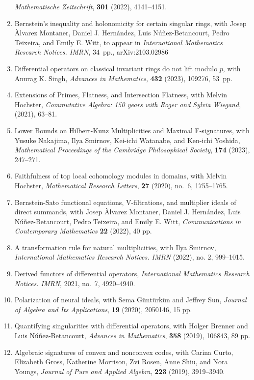 \documentclass[12pt]{amsart}
\newcommand{\N}{}
\begin{document}
\begin{enumerate}[leftmargin=9mm]
\emph{Mathematische Zeitschrift}, \textbf{301} (2022), 4141--4151.
	\item Bernstein's inequality and holonomicity for certain singular rings,
	with Josep Àlvarez Montaner, Daniel J. Hernández, Luis Núñez-Betancourt, Pedro Teixeira, and Emily E. Witt,
to appear in \emph{International Mathematics Research Notices. IMRN}, 34~pp., arXiv:2103.02986
	\item Differential operators on classical invariant rings do not lift modulo $p$,
with Anurag K. Singh, \emph{Advances in Mathematics}, \textbf{432} (2023), 109276, 53~pp.
\item Extensions of Primes, Flatness, and Intersection Flatness, with Melvin Hochster, \emph{Commutative Algebra: 150 years with Roger and Sylvia Wiegand}, (2021), 63--81. \N
\item Lower Bounds on Hilbert-Kunz Multiplicities and Maximal F-signatures, 
with Yusuke Nakajima, Ilya Smirnov, Kei-ichi Watanabe, and Ken-ichi Yoshida, 
\emph{Mathematical Proceedings of the Cambridge Philosophical Society},  \textbf{174} (2023), 247--271.
\item Faithfulness of top local cohomology modules in domains,
with Melvin Hochster, \emph{Mathematical Research Letters}, \textbf{27} (2020), no.~6, 1755--1765.  \N
\item Bernstein-Sato functional equations, V-filtrations, and multiplier ideals of direct summands,
with Josep \`Alvarez Montaner, Daniel J. Hernández, Luis N\'u\~nez-Betancourt, Pedro Teixeira, and Emily E. Witt,
\emph{Communications in Contemporary Mathematics} \textbf{22} (2022), 40 pp.  \N
\item A transformation rule for natural multiplicities,
with Ilya Smirnov,  \emph{International Mathematics Research Notices. IMRN} (2022), no. 2, 999--1015.
\item Derived functors of differential operators,   \emph{International Mathematics Research Notices. IMRN}, 2021, no.~7, 4920--4940. \N
\item Polarization of neural ideals, with Sema G\"unt\"urk\"un and Jeffrey Sun, \emph{Journal of Algebra and Its Applications}, \textbf{19} (2020), 2050146, 15 pp. \N
\item Quantifying singularities with differential operators, with Holger Brenner and Luis N\'u\~nez-Betancourt, \emph{Advances in Mathematics},  \textbf{358} (2019), 106843, 89 pp. \N
\item Algebraic signatures of convex and nonconvex codes, with Carina Curto, Elizabeth Gross, Katherine Morrison, Zvi Rosen, Anne Shiu, and Nora Youngs, \emph{Journal of Pure and Applied Algebra}, \textbf{223} (2019), 3919--3940. \N

\end{enumerate}
\end{document}
